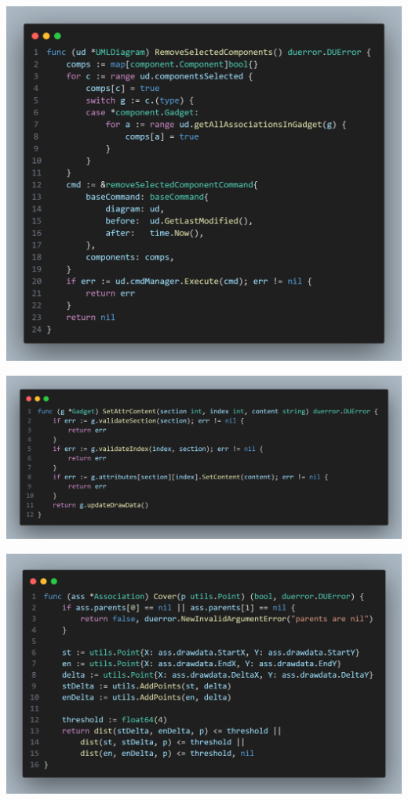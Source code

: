 \documentclass[12pt]{article}
\begin{document}
    \begin{center}
        \includegraphics[width=0.95\linewidth]
        {assets/hw7/syscode3.png}
    \end{center}

    \begin{center}
        \includegraphics[width=0.95\linewidth]
        {assets/hw7/syscode4.png}
    \end{center}

    \begin{center}
        \includegraphics[width=0.95\linewidth]
        {assets/hw7/syscode5.png}
    \end{center}
\end{document}
